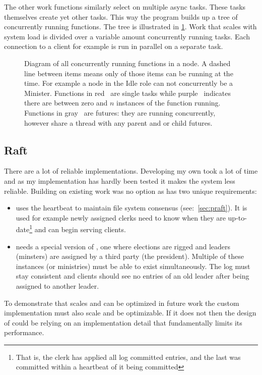 The other work functions similarly select on multiple async tasks. These tasks themselves create yet other tasks. This way the program builds up a tree of concurrently running functions. The tree is illustrated in \cref{fig:tree}. Work that scales with system load is divided over a variable amount concurrently running tasks. Each connection to a client for example is run in parallel on a separate task.
%
\clearpage
\thispagestyle{empty}
\begin{figure}[htbp]
	\centering
	
	\caption{Diagram of all concurrently running functions in a node. A dashed line between items means only of those items can be running at the time. For example a node in the Idle role can not concurrently be a Minister. Functions in red~\taskLeg{} are single tasks while purple~\tasksLeg{} indicates there are between zero and $n$ instances of the function running. Functions in gray~\futureLeg{} are futures: they are running concurrently, however share a thread with any parent and or child futures.}
	\label{fig:tree}
\end{figure}
\clearpage

\subsection{Raft}
There are a lot of reliable \raft{} implementations. Developing my own took a lot of time and as my implementation has hardly been tested it makes the system less reliable. Building on existing work was no option as \name{} has two unique requirements: 
%
\begin{itemize}
	\item \Name{} uses the \raft{} heartbeat to maintain file system consensus (see:~\cref{sec:praft}). It is used for example newly assigned clerks need to know when they are up-to-date\footnote{That is, the clerk has applied all log committed entries, and the last was committed within a \raft{} heartbeat of it being committed} and can begin serving clients. 
	\item \Name{} needs a special version of \raft{}, one where elections are rigged and leaders (minsters) are assigned by a third party (the president). Multiple of these instances (or ministries) must be able to exist simultaneously. The log must stay consistent and clients should see no entries of an old leader after being assigned to another leader. 
\end{itemize}
%
To demonstrate that \name{} scales and can be optimized in future work %
the custom implementation must also scale and be optimizable. If it does not then the design of \name{} could be relying on an implementation detail that fundamentally limits its performance.
%
